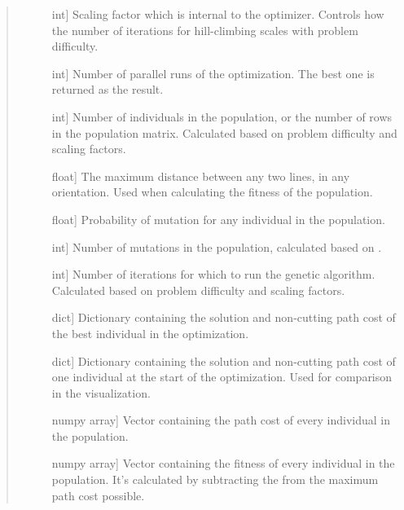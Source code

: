 \documentclass[letterpaper,10pt,english,openany,oneside]{sphinxmanual}
\begin{document}
\begin{fulllineitems}
\begin{quote}
\begin{description}
\begin{description}
\item[{}] \leavevmode{[}int{]}
Scaling factor which is internal to the optimizer. Controls how the
number of iterations for hill-climbing scales with problem difficulty.

\item[{}] \leavevmode{[}int{]}
Number of parallel runs of the optimization. The best one is returned
as the result.

\item[{}] \leavevmode{[}int{]}
Number of individuals in the population, or the number of rows in the
population matrix. Calculated based on problem difficulty and scaling
factors.

\item[{}] \leavevmode{[}float{]}
The maximum distance between any two lines, in any orientation. Used
when calculating the fitness of the population.

\item[{}] \leavevmode{[}float{]}
Probability of mutation for any individual in the population.

\item[{}] \leavevmode{[}int{]}
Number of mutations in the population, calculated based on .

\item[{}] \leavevmode{[}int{]}
Number of iterations for which to run the genetic algorithm. Calculated
based on problem difficulty and scaling factors.

\item[{}] \leavevmode{[}dict{]}
Dictionary containing the solution and non-cutting path cost of the
best individual in the optimization.

\item[{}] \leavevmode{[}dict{]}
Dictionary containing the solution and non-cutting path cost of one
individual at the start of the optimization. Used for comparison in the
visualization.

\item[{}] \leavevmode{[}numpy array{]}
Vector containing the path cost of every individual in the population.

\item[{}] \leavevmode{[}numpy array{]}
Vector containing the fitness of every individual in the population.
It’s calculated by subtracting the  from the maximum path
cost possible.


\end{description}
\end{description}
\end{quote}
\end{fulllineitems}
\end{document}
